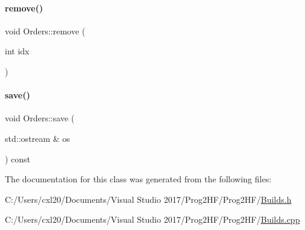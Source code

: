 \mbox{\label{class_orders_a36a43f158466760d315ca23ac24bd4bd}} 
\paragraph{\texorpdfstring{remove()}{remove()}}
{\footnotesize\ttfamily void Orders\+::remove (\begin{DoxyParamCaption}\item[{int}]{idx }\end{DoxyParamCaption})}

\mbox{\label{class_orders_a80770bd5dffc2d83de0e9acfaad14229}} 
\paragraph{\texorpdfstring{save()}{save()}}
{\footnotesize\ttfamily void Orders\+::save (\begin{DoxyParamCaption}\item[{std\+::ostream \&}]{os }\end{DoxyParamCaption}) const}



The documentation for this class was generated from the following files\+:\begin{DoxyCompactItemize}
\item 
C\+:/\+Users/cxl20/\+Documents/\+Visual Studio 2017/\+Prog2\+H\+F/\+Prog2\+H\+F/\mbox{\hyperlink{_builds_8h}{Builds.\+h}}\item 
C\+:/\+Users/cxl20/\+Documents/\+Visual Studio 2017/\+Prog2\+H\+F/\+Prog2\+H\+F/\mbox{\hyperlink{_builds_8cpp}{Builds.\+cpp}}\end{DoxyCompactItemize}
